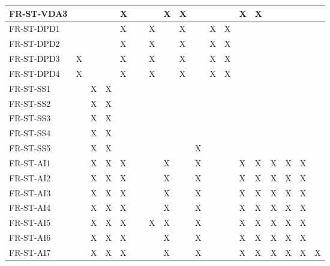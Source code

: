 \documentclass[12pt, titlepage]{article}
\begin{document}
\begin{table}[!ht]
{\begin{tabular}{|l|l|l|l|l|l|l|l|l|l|l|l|l|l|l|l|l|l|}
      FR-ST-VDA3 & ~ & ~ & ~ & X & ~ & ~ & X & X & ~ & ~ & ~ & X & X & ~ & ~ & ~ & ~ \\ \hline
      FR-ST-DPD1 & ~ & ~ & ~ & X & ~ & X & ~ & X & ~ & X & X & ~ & ~ & ~ & ~ & ~ & ~ \\ \hline
      FR-ST-DPD2 & ~ & ~ & ~ & X & ~ & X & ~ & X & ~ & X & X & ~ & ~ & ~ & ~ & ~ & ~ \\ \hline
      FR-ST-DPD3 & X & ~ & ~ & X & ~ & X & ~ & X & ~ & X & X & ~ & ~ & ~ & ~ & ~ & ~ \\ \hline
      FR-ST-DPD4 & X & ~ & ~ & X & ~ & X & ~ & X & ~ & X & X & ~ & ~ & ~ & ~ & ~ & ~ \\ \hline
      FR-ST-SS1 & ~ & X & X & ~ & ~ & ~ & ~ & ~ & ~ & ~ & ~ & ~ & ~ & ~ & ~ & ~ & ~ \\ \hline
      FR-ST-SS2 & ~ & X & X & ~ & ~ & ~ & ~ & ~ & ~ & ~ & ~ & ~ & ~ & ~ & ~ & ~ & ~ \\ \hline
      FR-ST-SS3 & ~ & X & X & ~ & ~ & ~ & ~ & ~ & ~ & ~ & ~ & ~ & ~ & ~ & ~ & ~ & ~ \\ \hline
      FR-ST-SS4 & ~ & X & X & ~ & ~ & ~ & ~ & ~ & ~ & ~ & ~ & ~ & ~ & ~ & ~ & ~ & ~ \\ \hline
      FR-ST-SS5 & ~ & X & X & ~ & ~ & ~ & ~ & ~ & X & ~ & ~ & ~ & ~ & ~ & ~ & ~ & ~ \\ \hline
      FR-ST-AI1 & ~ & X & X & X & ~ & ~ & X & ~ & X & ~ & ~ & X & X & X & X & X & ~ \\ \hline
      FR-ST-AI2 & ~ & X & X & X & ~ & ~ & X & ~ & X & ~ & ~ & X & X & X & X & X & ~ \\ \hline
      FR-ST-AI3 & ~ & X & X & X & ~ & ~ & X & ~ & X & ~ & ~ & X & X & X & X & X & ~ \\ \hline
      FR-ST-AI4 & ~ & X & X & X & ~ & ~ & X & ~ & X & ~ & ~ & X & X & X & X & X & ~ \\ \hline
      FR-ST-AI5 & ~ & X & X & X & ~ & X & X & ~ & X & ~ & ~ & X & X & X & X & X & ~ \\ \hline
      FR-ST-AI6 & ~ & X & X & X & ~ & ~ & X & ~ & X & ~ & ~ & X & X & X & X & X & ~ \\ \hline
      FR-ST-AI7 & ~ & X & X & X & ~ & ~ & X & ~ & X & ~ & ~ & X & X & X & X & X & X \\ \hline
  \end{tabular}
  }
\end{table}

% 

\newpage
% 

\newpage
\end{document}
